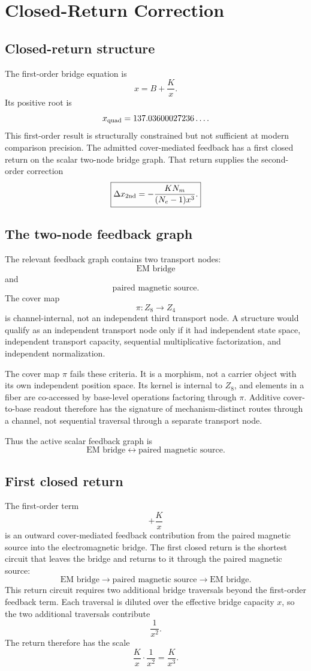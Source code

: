 \section{Closed-Return Correction}

\subsection{Closed-return structure}

The first-order bridge equation is
\[
x=B+\frac{K}{x}.
\]
Its positive root is
\[
x_{\rm quad}=137.03600027236\ldots.
\]
This first-order result is structurally constrained but not sufficient at
modern comparison precision. The admitted cover-mediated feedback has a
first closed return on the scalar two-node bridge graph. That return
supplies the second-order correction
\[
\boxed{
\Delta x_{\rm 2nd}
=
-\frac{K N_m}{(N_e-1)x^3}.
}
\]

\subsection{The two-node feedback graph}

The relevant feedback graph contains two transport nodes:
\[
\text{EM bridge}
\]
and
\[
\text{paired magnetic source}.
\]
The cover map
\[
\pi:Z_8\to Z_4
\]
is channel-internal, not an independent third transport node. A structure
would qualify as an independent transport node only if it had independent
state space, independent transport capacity, sequential multiplicative
factorization, and independent normalization.

The cover map \(\pi\) fails these criteria. It is a morphism, not a
carrier object with its own independent position space. Its kernel is
internal to \(Z_8\), and elements in a fiber are co-accessed by
base-level operations factoring through \(\pi\). Additive cover-to-base
readout therefore has the signature of mechanism-distinct routes through
a channel, not sequential traversal through a separate transport node.

Thus the active scalar feedback graph is
\[
\text{EM bridge}
\longleftrightarrow
\text{paired magnetic source}.
\]

\subsection{First closed return}

The first-order term
\[
+\frac{K}{x}
\]
is an outward cover-mediated feedback contribution from the paired
magnetic source into the electromagnetic bridge. The first closed return
is the shortest circuit that leaves the bridge and returns to it through
the paired magnetic source:
\[
\text{EM bridge}
\rightarrow
\text{paired magnetic source}
\rightarrow
\text{EM bridge}.
\]
This return circuit requires two additional bridge traversals beyond the
first-order feedback term. Each traversal is diluted over the effective
bridge capacity \(x\), so the two additional traversals contribute
\[
\frac1{x^2}.
\]
The return therefore has the scale
\[
\frac{K}{x}\cdot\frac1{x^2}
=
\frac{K}{x^3}.
\]

